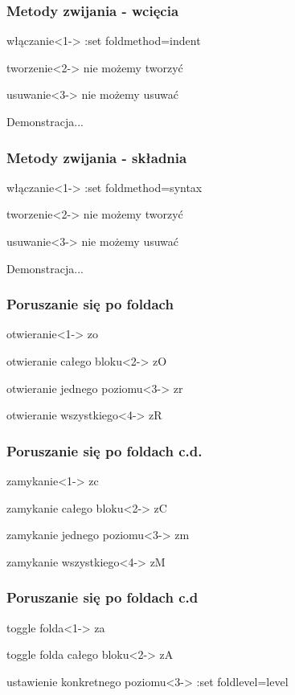 \documentclass{beamer}
\begin{document}
\begin{frame}
	\frametitle{Metody zwijania - wcięcia}
	\begin{block}{włączanie}<1->
	:set foldmethod=indent
	\end{block}
	\begin{block}{tworzenie}<2->
	nie możemy tworzyć
	\end{block}
	\begin{block}{usuwanie}<3->
	nie możemy usuwać
	\end{block}
	{
		Demonstracja...
	}
\end{frame}
\begin{frame}
	\frametitle{Metody zwijania - składnia}
	\begin{block}{włączanie}<1->
	:set foldmethod=syntax
	\end{block}
	\begin{block}{tworzenie}<2->
	nie możemy tworzyć
	\end{block}
	\begin{block}{usuwanie}<3->
	nie możemy usuwać
	\end{block}
	{
		Demonstracja...
	}
\end{frame}
\begin{frame}
	\frametitle{Poruszanie się po foldach}
	\begin{block}{otwieranie}<1->
	zo
	\end{block}
	\begin{block}{otwieranie całego bloku}<2->
	zO
	\end{block}
	\begin{block}{otwieranie jednego poziomu}<3->
	zr
	\end{block}
	\begin{block}{otwieranie wszystkiego}<4->
	zR
	\end{block}
\end{frame}
\begin{frame}
	\frametitle{Poruszanie się po foldach c.d.}
	\begin{block}{zamykanie}<1->
	zc
	\end{block}
	\begin{block}{zamykanie całego bloku}<2->
	zC
	\end{block}
	\begin{block}{zamykanie jednego poziomu}<3->
	zm
	\end{block}
	\begin{block}{zamykanie wszystkiego}<4->
	zM
	\end{block}
\end{frame}
\begin{frame}
	\frametitle{Poruszanie się po foldach c.d}
	\begin{block}{toggle folda}<1->
	za
	\end{block}
	\begin{block}{toggle folda całego bloku}<2->
	zA
	\end{block}
	\begin{block}{ustawienie konkretnego poziomu}<3->
	:set foldlevel=level
	\end{block}
\end{frame}
\end{document}
